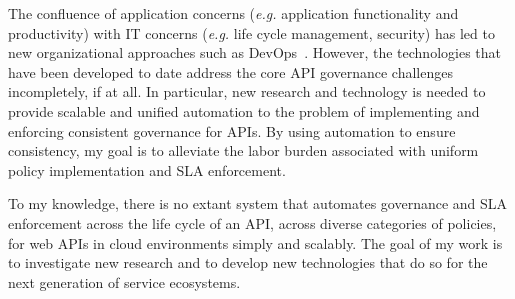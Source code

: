 The confluence of application concerns ({\em e.g.} 
application functionality and productivity) with IT 
concerns ({\em e.g.} life cycle management, security) 
has led to new organizational approaches such as
DevOps~\cite{devops}.  However, 
the technologies that have been developed
to date address the core API
governance challenges incompletely, if at all. 
In particular, new research and technology is needed 
to provide scalable and unified automation to the problem
of implementing and enforcing consistent governance for APIs. 
By using automation to ensure consistency, my goal is to alleviate the 
labor burden associated with uniform policy implementation and SLA enforcement.  

To my knowledge, there is no extant system that automates governance and
SLA enforcement across the life cycle
of an API, across diverse categories of policies, for web
APIs in cloud environments simply and scalably. The goal of my work is to investigate 
new research and to develop
new technologies that do so for the next generation of service ecosystems.